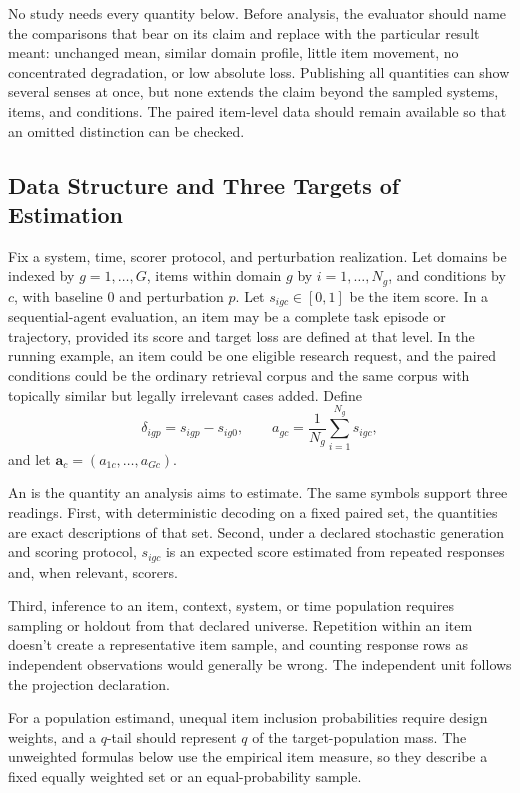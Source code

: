 \documentclass[12pt]{article}
\begin{document}
No study needs every quantity below. Before analysis, the evaluator should name the comparisons that bear on its claim and replace  with the particular result meant: unchanged mean, similar domain profile, little item movement, no concentrated degradation, or low absolute loss. Publishing all quantities can show several senses at once, but none extends the claim beyond the sampled systems, items, and conditions. The paired item-level data should remain available so that an omitted distinction can be checked.

\subsection{Data Structure and Three Targets of Estimation}\label{ssec:setup}

Fix a system, time, scorer protocol, and perturbation realization. Let domains be indexed by \(g=1,\ldots,G\), items within domain \(g\) by \(i=1,\ldots,N_g\), and conditions by \(c\), with baseline \(0\) and perturbation \(p\). Let \(s_{igc}\in[0,1]\) be the item score. In a sequential-agent evaluation, an item may be a complete task episode or trajectory, provided its score and target loss are defined at that level. In the running example, an item could be one eligible research request, and the paired conditions could be the ordinary retrieval corpus and the same corpus with topically similar but legally irrelevant cases added. Define
\[
\delta_{igp}=s_{igp}-s_{ig0},
\qquad
a_{gc}=\frac{1}{N_g}\sum_{i=1}^{N_g}s_{igc},
\]
and let \(\mathbf a_c=(a_{1c},\ldots,a_{Gc})\).

An  is the quantity an analysis aims to estimate. The same symbols support three readings. First, with deterministic decoding on a fixed paired set, the quantities are exact descriptions of that set. Second, under a declared stochastic generation and scoring protocol, \(s_{igc}\) is an expected score estimated from repeated responses and, when relevant, scorers.

Third, inference to an item, context, system, or time population requires sampling or holdout from that declared universe. Repetition within an item doesn't create a representative item sample, and counting response rows as independent observations would generally be wrong. The independent unit follows the projection declaration.

For a population estimand, unequal item inclusion probabilities require design weights, and a \(q\)-tail should represent \(q\) of the target-population mass. The unweighted formulas below use the empirical item measure, so they describe a fixed equally weighted set or an equal-probability sample.
\end{document}
